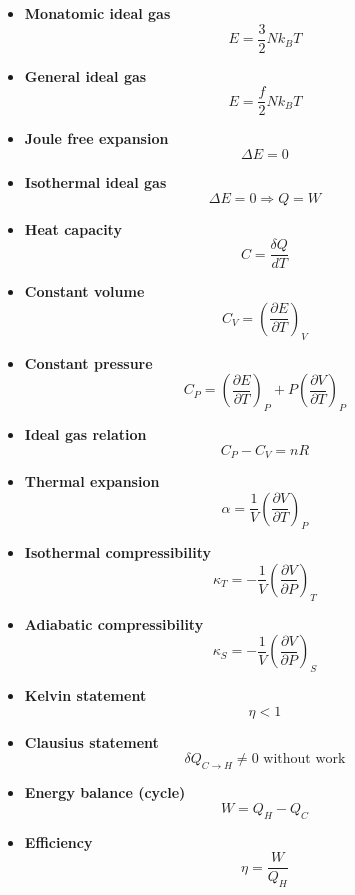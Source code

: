 \documentclass[9pt,twocoloumn]{article}
\begin{document}
\begin{itemize}
\item \textbf{Monatomic ideal gas}
\[
E = \frac{3}{2}Nk_BT
\]

\item \textbf{General ideal gas}
\[
E = \frac{f}{2}Nk_BT
\]

\item \textbf{Joule free expansion}
\[
\Delta E = 0
\]

\item \textbf{Isothermal ideal gas}
\[
\Delta E = 0 \Rightarrow Q = W
\]

\item \textbf{Heat capacity}
\[
C = \frac{\delta Q}{dT}
\]

\item \textbf{Constant volume}
\[
C_V = \left(\frac{\partial E}{\partial T}\right)_V
\]

\item \textbf{Constant pressure}
\[
C_P = \left(\frac{\partial E}{\partial T}\right)_P
      + P\left(\frac{\partial V}{\partial T}\right)_P
\]

\item \textbf{Ideal gas relation}
\[
C_P - C_V = nR
\]

\item \textbf{Thermal expansion}
\[
\alpha = \frac{1}{V}\left(\frac{\partial V}{\partial T}\right)_P
\]

\item \textbf{Isothermal compressibility}
\[
\kappa_T = -\frac{1}{V}\left(\frac{\partial V}{\partial P}\right)_T
\]

\item \textbf{Adiabatic compressibility}
\[
\kappa_S = -\frac{1}{V}\left(\frac{\partial V}{\partial P}\right)_S
\]

\item \textbf{Kelvin statement}
\[
\eta < 1
\]

\item \textbf{Clausius statement}
\[
\delta Q_{C\to H} \neq 0 \text{ without work}
\]

\item \textbf{Energy balance (cycle)}
\[
W = Q_H - Q_C
\]

\item \textbf{Efficiency}
\[
\eta = \frac{W}{Q_H}
\]


\end{itemize}
\end{document}
